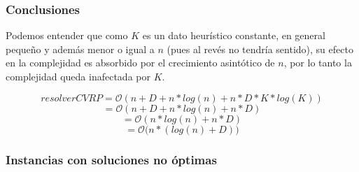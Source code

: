 \subsubsection{Conclusiones}
Podemos entender que como $K$ es un dato heurístico constante, en general pequeño y además menor o igual a $n$ (pues al revés no tendría sentido), su efecto en la complejidad es absorbido por el crecimiento asintótico de $n$, por lo tanto la complejidad queda inafectada por $K$.

$$resolverCVRP = \mathcal{O}(n+D + n*log(n) + n*D*K*log(K))$$
$$= \mathcal{O}(n+D + n*log(n) + n*D)$$
$$= \mathcal{O}(n*log(n) + n*D)$$
$$= \mathcal{O}\Big( n*(log(n) + D)\Big)$$

\subsubsection{Instancias con soluciones no óptimas}


